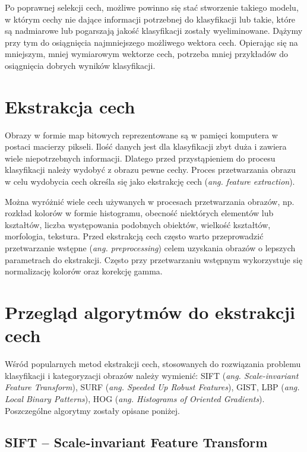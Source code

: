 
Po poprawnej selekcji cech, możliwe powinno się stać stworzenie takiego modelu, w którym cechy nie dające informacji potrzebnej do klasyfikacji lub takie, które są nadmiarowe lub pogarszają jakość klasyfikacji zostały wyeliminowane. Dążymy przy tym do osiągnięcia najmniejszego możliwego wektora cech. Opierając się na mniejszym, mniej wymiarowym wektorze cech, potrzeba mniej przykładów do osiągnięcia dobrych wyników klasyfikacji.

\section{Ekstrakcja cech}

Obrazy w formie map bitowych reprezentowane są w pamięci komputera w postaci macierzy pikseli. Ilość danych jest dla klasyfikacji zbyt duża i zawiera wiele niepotrzebnych informacji. Dlatego przed przystąpieniem do procesu klasyfikacji należy wydobyć z obrazu pewne cechy. Proces przetwarzania obrazu w celu wydobycia cech określa się jako ekstrakcję cech (\emph{ang. feature extraction}).

Można wyróżnić wiele cech używanych w procesach przetwarzania obrazów, np. rozkład kolorów w formie histogramu, obecność niektórych elementów lub kształtów, liczba występowania podobnych obiektów, wielkość kształtów, morfologia, tekstura. Przed ekstrakcją cech często warto przeprowadzić przetwarzanie wstępne (\emph{ang. preprocessing}) celem uzyskania obrazów o lepszych parametrach do ekstrakcji. Często przy przetwarzaniu wstępnym wykorzystuje się normalizację kolorów oraz korekcję gamma.

\section{Przegląd algorytmów do ekstrakcji cech}

Wśród popularnych metod ekstrakcji cech, stosowanych do rozwiązania problemu klasyfikacji i kategoryzacji obrazów należy wymienić: SIFT (\emph{ang. Scale-invariant Feature Transform})\cite{SIFT99}, SURF (\emph{ang. Speeded Up Robust Features}), GIST\cite{GIST09}, LBP (\emph{ang. Local Binary Patterns}), HOG (\emph{ang. Histograms of Oriented Gradients}). Poszczególne algorytmy zostały opisane poniżej.

\subsection{SIFT -- Scale-invariant Feature Transform}

